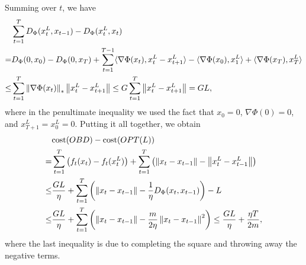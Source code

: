 Summing over $t$, we have 
\begin{align*}
& \sum_{t=1}^T  D_\Phi(x_t^L, x_{t-1}) - D_\Phi(x_t^L, x_t) \\
= &D_{\Phi}(0, x_0) - D_\Phi(0, x_T) + \sum_{t=1}^{T-1} \langle\nabla \Phi(x_t), x_t^L - x_{t+1}^L \rangle - \langle \nabla \Phi(x_0), x_1^L \rangle + \langle \nabla \Phi(x_T), x_T^L\rangle \\
\le & \sum_{t=1}^T \left\lVert  \nabla \Phi(x_t) \right\rVert_* \left\lVert  x_t^L - x_{t+1}^L \right\rVert \le G \sum_{t=1}^T \left\lVert x_t^L - x_{t+1}^L  \right\rVert= GL,
\end{align*}
where in the penultimate inequality we used the fact that $x_0 = 0$, $\nabla \Phi(0) = 0$, and $x_{T+1}^L = x_0^L = 0$. Putting it all together, we obtain 
\begin{align*}
&\mathrm{cost}(OBD) - \mathrm{cost}(OPT(L)) \\
= &\sum_{t=1}^T \left(f_t(x_t) - f_t(x_t^L)\right) + \sum_{t=1}^T \left( \left\lVert x_t - x_{t-1} \right\rVert - \left\lVert x_t^L - x_{t-1}^L \right\rVert\right) \\
\le &\frac{GL}{\eta}  + \sum_{t=1}^T \left(\left\lVert x_t - x_{t-1} \right\rVert - \frac{1}{\eta} D_\Phi(x_t, x_{t-1}) \right) - L \\
\le &\frac{GL }{\eta}  + \sum_{t=1}^T \left(\left\lVert x_t - x_{t-1} \right\rVert - \frac{m}{2\eta} \left\lVert x_t - x_{t-1} \right\rVert^2 \right) 
\le \frac{ GL }{\eta} + \frac{\eta T}{2m}, 
\end{align*}
where the last inequality is due to completing the square and throwing away the negative terms.






